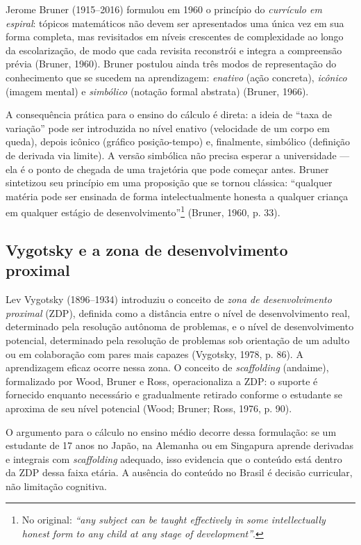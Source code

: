 \documentclass[12pt,a4paper,oneside]{article}
\begin{document}
Jerome Bruner (1915--2016) formulou em 1960 o princípio do \emph{currículo
em espiral}: tópicos matemáticos não devem ser apresentados uma única vez
em sua forma completa, mas revisitados em níveis crescentes de
complexidade ao longo da escolarização, de modo que cada revisita
reconstrói e integra a compreensão prévia (Bruner, 1960). Bruner postulou
ainda três modos de representação do conhecimento que se sucedem na
aprendizagem: \emph{enativo} (ação concreta), \emph{icônico} (imagem
mental) e \emph{simbólico} (notação formal abstrata) (Bruner, 1966).

A consequência prática para o ensino do cálculo é direta: a ideia de
``taxa de variação'' pode ser introduzida no nível enativo (velocidade de
um corpo em queda), depois icônico (gráfico posição-tempo) e, finalmente,
simbólico (definição de derivada via limite). A versão simbólica não
precisa esperar a universidade --- ela é o ponto de chegada de uma
trajetória que pode começar antes. Bruner sintetizou seu princípio em
uma proposição que se tornou clássica: ``qualquer matéria pode ser
ensinada de forma intelectualmente honesta a qualquer criança em qualquer
estágio de desenvolvimento''\footnote{No original: \emph{``any subject
can be taught effectively in some intellectually honest form to any child
at any stage of development''}.} (Bruner, 1960, p. 33).

\subsection{Vygotsky e a zona de desenvolvimento proximal}

Lev Vygotsky (1896--1934) introduziu o conceito de \emph{zona de
desenvolvimento proximal} (ZDP), definida como a distância entre o nível
de desenvolvimento real, determinado pela resolução autônoma de
problemas, e o nível de desenvolvimento potencial, determinado pela
resolução de problemas sob orientação de um adulto ou em colaboração com
pares mais capazes (Vygotsky, 1978, p. 86). A aprendizagem eficaz ocorre
nessa zona. O conceito de \emph{scaffolding} (andaime), formalizado por
Wood, Bruner e Ross, operacionaliza a ZDP: o suporte é fornecido enquanto
necessário e gradualmente retirado conforme o estudante se aproxima de
seu nível potencial (Wood; Bruner; Ross, 1976, p. 90).

O argumento para o cálculo no ensino médio decorre dessa formulação: se
um estudante de 17 anos no Japão, na Alemanha ou em Singapura aprende
derivadas e integrais com \emph{scaffolding} adequado, isso evidencia que
o conteúdo está dentro da ZDP dessa faixa etária. A ausência do conteúdo
no Brasil é decisão curricular, não limitação cognitiva.
\end{document}
